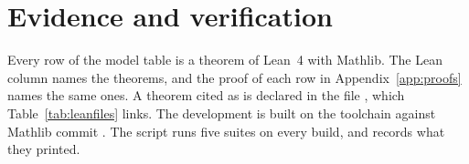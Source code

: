 \section{Evidence and verification}
\label{app:evidence}

Every row of the model table is a theorem of Lean~4 with Mathlib. The Lean
column names the theorems, and the proof of each row in
Appendix~\ref{app:proofs} names the same ones. A theorem cited as
 is declared in the file ,
which Table~\ref{tab:leanfiles} links. The development is built on the
toolchain  against Mathlib commit . The script
 runs five suites on every build, and 
records what they printed.

\footnotesize
